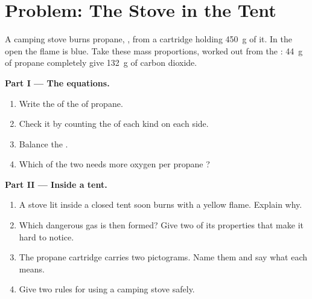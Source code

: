 \section{Problem: The Stove in the Tent}

\begin{problem}
\label{pb:g8:combustion-and-fuels:1}
A camping stove burns propane, , from a cartridge holding
\qty{450}{g} of it. In the open  the flame is blue. Take these mass
proportions, worked out from the : \qty{44}{g} of
propane  completely give \qty{132}{g} of carbon dioxide.

\medskip
\noindent\textbf{Part I --- The equations.}
\begin{enumerate}
  \item Write the  of the  of
        propane.
  \item Check it by counting the  of each kind on each side.
  \item Balance the 
        . %
  \item Which of the two needs more oxygen per propane ?
\end{enumerate}

\medskip
\noindent\textbf{Part II --- Inside a tent.}
\begin{enumerate}[resume]
  \item A stove lit inside a closed tent soon burns with a yellow flame.
        Explain why.
  \item Which dangerous gas is then formed? Give two of its properties
        that make it hard to notice.
  \item The propane cartridge carries two pictograms. Name them and say
        what each means.
  \item Give two rules for using a camping stove safely.
\end{enumerate}


\end{problem}
